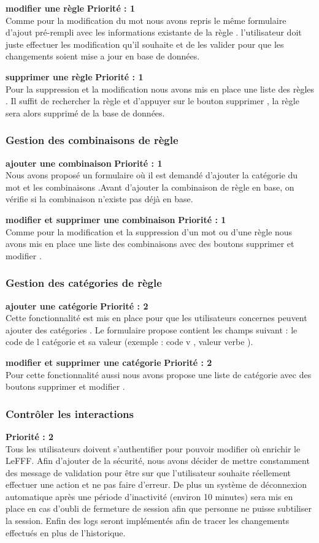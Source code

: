\documentclass[12pt,a4paper]{article}
\begin{document}
\textbf{modifier une règle } \textbf{Priorité : 1} \\ Comme pour la modification du mot nous avons repris le même formulaire d'ajout pré-rempli avec les informations existante de la règle . l'utilisateur doit juste effectuer les modification qu'il souhaite et de les valider pour que les changements soient mise a jour  en base de données.


\textbf{supprimer une règle } \textbf{Priorité : 1} \\ Pour la suppression et la modification nous avons mis en place une liste des règles . Il suffit de rechercher la règle et d'appuyer sur le bouton supprimer , la règle  sera alors supprimé de la base de données.

\subsubsection{Gestion des combinaisons de règle }
\textbf{ajouter une combinaison } \textbf{Priorité : 1} \\ Nous avons proposé un formulaire où il est demandé d'ajouter la catégorie du mot et les combinaisons .Avant d'ajouter la combinaison de règle en base, on vérifie si la combinaison n'existe pas déjà en base.


\textbf{modifier et supprimer une combinaison } \textbf{Priorité : 1} \\ Comme pour la modification et la suppression d'un mot ou d'une règle nous avons mis en place une liste des combinaisons avec des boutons supprimer et modifier .


\subsubsection{Gestion des catégories de règle }
\textbf{ajouter une catégorie } \textbf{Priorité : 2}\\ Cette fonctionnalité  est mis en place pour que les utilisateurs concernes peuvent ajouter des catégories . Le formulaire propose contient les champs suivant : le code de l catégorie et sa valeur (exemple : code v , valeur verbe ).

\textbf{modifier et supprimer  une catégorie } \textbf{Priorité : 2}\\ Pour cette fonctionnalité aussi nous avons propose une liste de catégorie avec des boutons supprimer et modifier .
\subsubsection{Contrôler les interactions }
 \textbf{Priorité : 2}
\\ Tous les utilisateurs doivent s'authentifier pour pouvoir modifier où enrichir le LeFFF. Afin d'ajouter de la sécurité, nous avons décider de mettre constamment des message de validation pour être sur que l'utilisateur souhaite réellement effectuer une action et ne pas faire d'erreur.
De plus un système de déconnexion automatique après une période d'inactivité (environ 10 minutes) sera mis en place en cas d'oubli de fermeture de session afin que personne ne puisse subtiliser la session.
Enfin des logs seront implémentés afin de tracer les changements effectués en plus de l'historique.
\end{document}
